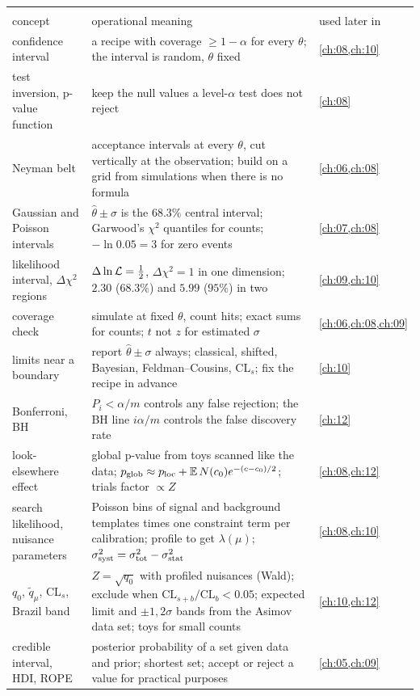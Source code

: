 \begin{center}
\small
\renewcommand{\arraystretch}{1.15}
\begin{tabularx}{\linewidth}{@{}>{\raggedright\arraybackslash}p{3.3cm}
                               >{\raggedright\arraybackslash}X
                               >{\raggedright\arraybackslash}p{2.7cm}@{}}
\toprule
\multicolumn{3}{@{}l}{\textbf{Intervals, coverage and many tests (second half)}}\\
concept & operational meaning & used later in\\\midrule
confidence interval & a recipe with coverage $\ge1-\alpha$ for every $\theta$; the interval is random, $\theta$ fixed & \cref{ch:08,ch:10}\\
test inversion, p-value function & keep the null values a level-$\alpha$ test does not reject & \cref{ch:08}\\
Neyman belt & acceptance intervals at every $\theta$, cut vertically at the observation; build on a grid from simulations when there is no formula & \cref{ch:06,ch:08}\\
Gaussian and Poisson intervals & $\hat\theta\pm\sigma$ is the $68.3\%$ central interval; Garwood's $\chi^2$ quantiles for counts; $-\ln0.05=3$ for zero events & \cref{ch:07,ch:08}\\
likelihood interval, $\Delta\chi^2$ regions & $\Delta\ln\mathcal{L}=\tfrac12$, $\Delta\chi^2=1$ in one dimension; $2.30$ ($68.3\%$) and $5.99$ ($95\%$) in two & \cref{ch:09,ch:10}\\
coverage check & simulate at fixed $\theta$, count hits; exact sums for counts; $t$ not $z$ for estimated $\sigma$ & \cref{ch:06,ch:08,ch:09}\\
limits near a boundary & report $\hat\theta\pm\sigma$ always; classical, shifted, Bayesian, Feldman--Cousins, CL$_s$; fix the recipe in advance & \cref{ch:10}\\
Bonferroni, BH & $P_i<\alpha/m$ controls any false rejection; the BH line $i\alpha/m$ controls the false discovery rate & \cref{ch:12}\\
look-elsewhere effect & global p-value from toys scanned like the data; $p_{\rm glob}\approx p_{\rm loc}+\E N(c_0)e^{-(c-c_0)/2}$; trials factor $\propto Z$ & \cref{ch:08,ch:12}\\
search likelihood, nuisance parameters & Poisson bins of signal and background templates times one constraint term per calibration; profile to get $\lambda(\mu)$; $\sigma_{\rm syst}^2=\sigma_{\rm tot}^2-\sigma_{\rm stat}^2$ & \cref{ch:08,ch:10}\\
$q_0$, $\tilde q_\mu$, CL$_s$, Brazil band & $Z=\sqrt{q_0}$ with profiled nuisances (Wald); exclude when $\mathrm{CL}_{s+b}/\mathrm{CL}_b<0.05$; expected limit and $\pm1,2\sigma$ bands from the Asimov data set; toys for small counts & \cref{ch:10,ch:12}\\
credible interval, HDI, ROPE & posterior probability of a set given data and prior; shortest set; accept or reject a value for practical purposes & \cref{ch:05,ch:09}\\
\bottomrule
\end{tabularx}
\end{center}
\clearpage
\flushbottom
  